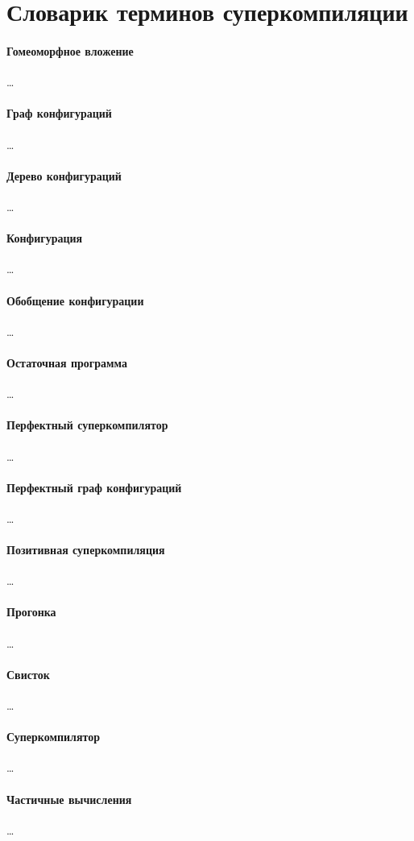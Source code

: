 \section{Словарик терминов суперкомпиляции}
\label{sec:glossary}

\paragraph{Гомеоморфное вложение} \ldots

\paragraph{Граф конфигураций} \ldots

\paragraph{Дерево конфигураций} \ldots

\paragraph{Конфигурация} \ldots

\paragraph{Обобщение конфигурации} \ldots

\paragraph{Остаточная программа} \ldots

\paragraph{Перфектный суперкомпилятор} \ldots

\paragraph{Перфектный граф конфигураций} \ldots

\paragraph{Позитивная суперкомпиляция} \ldots

\paragraph{Прогонка} \ldots

\paragraph{Свисток} \ldots

\paragraph{Суперкомпилятор} \ldots

\paragraph{Частичные вычисления} \ldots